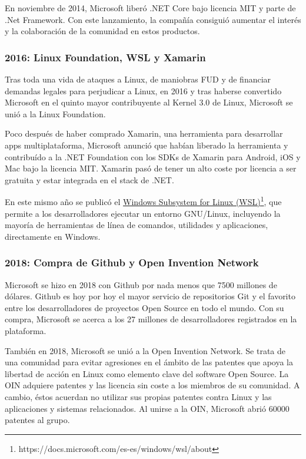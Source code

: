 En noviembre de 2014, Microsoft liberó .NET Core bajo licencia MIT y parte de .Net Framework. Con este lanzamiento, la compañía consiguió aumentar el interés y la colaboración de la comunidad en estos productos.\cite{arstechnica_2014:microsoft_open_sources_.NET}

\subsubsection{2016: Linux Foundation, WSL y Xamarin}
Tras toda una vida de ataques a Linux, de maniobras FUD y de financiar demandas legales para perjudicar a Linux, en 2016 y tras haberse convertido Microsoft en el quinto mayor contribuyente al Kernel 3.0 de Linux\cite{zdnet_2011:microsoft_contributes_linux}, Microsoft se unió a la Linux Foundation.\cite{arstechnica_2016:microsoft_joins_linux_foundation}

Poco después de haber comprado Xamarin, una herramienta para desarrollar apps multiplataforma, Microsoft anunció que habían liberado la herramienta y contribuído a la .NET Foundation con los SDKs de Xamarin para Android, iOS y Mac bajo la licencia MIT. Xamarin pasó de tener un alto coste por licencia a ser gratuita y estar integrada en el stack de .NET. \cite{genbeta_2016:microsoft_xamarin} \cite{petri_2016:microsoft_xamarin}

En este mismo año se publicó el \href{https://docs.microsoft.com/es-es/windows/wsl/about}{Windows Subsystem for Linux (WSL)}\footnote{https://docs.microsoft.com/es-es/windows/wsl/about}, que permite a los desarrolladores ejecutar un entorno GNU/Linux, incluyendo la mayoría de herramientas de línea de comandos, utilidades y aplicaciones, directamente en Windows.

\subsubsection{2018: Compra de Github y Open Invention Network}
Microsoft se hizo en 2018 con Github por nada menos que 7500 millones de dólares. Github es hoy por hoy el mayor servicio de repositorios Git y el favorito entre los desarrolladores de proyectos Open Source en todo el mundo. Con su compra, Microsoft se acerca a los 27 millones de desarrolladores registrados en la plataforma. \cite{xataca_2018:microsoft_gighub}

También en 2018, Microsoft se unió a la Open Invention Network. Se trata de una comunidad para evitar agresiones en el ámbito de las patentes que apoya la libertad de acción en Linux como elemento clave del software Open Source. La OIN adquiere patentes y las licencia sin coste a los miembros de su comunidad. A cambio, éstos acuerdan no utilizar sus propias patentes contra Linux y las aplicaciones y sistemas relacionados\cite{wiki_2020:open_invention_network}. Al unirse a la OIN, Microsoft abrió 60000 patentes al grupo\cite{azure_blogs_2018:microsoft_oin}.

